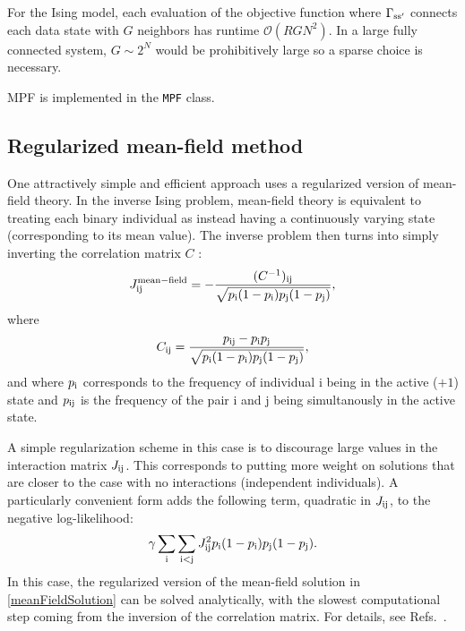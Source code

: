 \documentclass{jors}
\begin{document}

For the Ising model, each evaluation of the objective function where $\Gamma_{\rm s s'}$ connects each data state with $G$ neighbors has runtime $\mathcal{O}(RGN^2)$. In a large fully connected system, $G\sim 2^N$ would be prohibitively large so a sparse choice is necessary.

MPF is implemented in the {\tt MPF} class.

\subsection*{Regularized mean-field method}
One attractively simple and efficient approach uses a regularized version of
mean-field theory.  In the inverse Ising problem, mean-field theory is equivalent
to treating each binary individual as instead having a continuously varying state
(corresponding to its mean value).  The inverse problem then turns into simply inverting
the correlation matrix $C$ \cite{Monasson:2011fo}:
\begin{equation}
\label{meanFieldSolution}
J^{\mathrm{mean-field}}_{\rm ij} =
    - \frac{ (C^{-1})_{\rm ij} }{ \sqrt{p_{\rm i}(1-p_{\rm i})p_{\rm j}(1-p_{\rm j})} },
\end{equation}
where
\begin{equation}
C_{\rm ij} = \frac{ p_{\rm ij} - p_{\rm i} p_{\rm j} }{ \sqrt{p_{\rm i}(1-p_{\rm i})p_{\rm j}(1-p_{\rm j})} },
\end{equation}
and where $p_{\rm i}$ corresponds to the frequency of individual i being
in the active ($+1$) state and $p_{\rm ij}$ is the frequency of the pair
i and j being simultanously in the active state.

A simple regularization scheme in this case is to discourage large values in the interaction
matrix $J_{\rm ij}$.  This corresponds to putting more weight on solutions that are closer to
the case with no interactions (independent individuals).  A particularly convenient form
adds the following term, quadratic in $J_{\rm ij}$, to the negative log-likelihood:
\begin{equation}
\gamma \sum_{\rm i} \sum_{\rm i<j} J_{\rm ij}^2 p_{\rm i} (1-p_{\rm i}) p_{\rm j} (1-p_{\rm j}).
\end{equation}
In this case, the regularized version of the mean-field solution in \eqref{meanFieldSolution}
can be solved analytically, with the slowest computational step coming from the inversion
of the correlation matrix.  For details, see Refs.~\cite{Daniels:2017cq,Barton:2013fja}.
\end{document}
